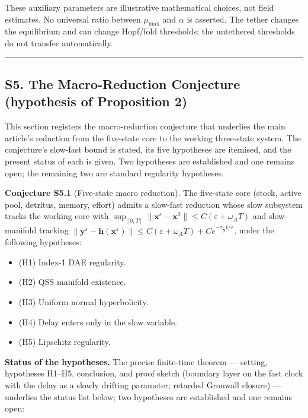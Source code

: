 \documentclass[
  10pt,
  a4paper,
]{article}
\providecommand{\tightlist}{%
  \setlength{\itemsep}{0pt}\setlength{\parskip}{0pt}}
\begin{document}
These auxiliary parameters are illustrative mathematical choices, not
field estimates. No universal ratio between \(\mu_{\max}\) and
\(\alpha\) is asserted. The tether changes the equilibrium and can
change Hopf/fold thresholds; the untethered thresholds do not transfer
automatically.

\begin{center}\rule{0.5\linewidth}{0.5pt}\end{center}

\subsection{S5. The Macro-Reduction Conjecture (hypothesis of
Proposition
2)}\label{s5.-the-macro-reduction-conjecture-hypothesis-of-proposition-2}

This section registers the macro-reduction conjecture that underlies the
main article's reduction from the five-state core to the working
three-state system. The conjecture's slow-fast bound is stated, its five
hypotheses are itemised, and the present status of each is given. Two
hypotheses are established and one remains open; the remaining two are
standard regularity hypotheses.

\textbf{Conjecture S5.1} (Five-state macro reduction). The five-state
core (stock, active pool, detritus, memory, effort) admits a slow-fast
reduction whose slow subsystem tracks the working core with
\(\sup_{[0,T]}\|\mathbf{x}^\varepsilon - \mathbf{x}^0\| \le C(\varepsilon + \omega_A T)\)
and slow-manifold tracking
\(\|\mathbf{y}^\varepsilon - \mathbf{h}(\mathbf{x}^\varepsilon)\| \le C(\varepsilon + \omega_A T) + Ce^{-\gamma_{\mathbf{y}}t/\varepsilon}\),
under the following hypotheses:

\begin{itemize}
\tightlist
\item
  (H1) Index-1 DAE regularity.
\item
  (H2) QSS manifold existence.
\item
  (H3) Uniform normal hyperbolicity.
\item
  (H4) Delay enters only in the slow variable.
\item
  (H5) Lipschitz regularity.
\end{itemize}

\textbf{Status of the hypotheses.} The precise finite-time theorem ---
setting, hypotheses H1--H5, conclusion, and proof sketch (boundary layer
on the fast clock with the delay as a slowly drifting parameter;
retarded Gronwall closure) --- underlies the status list below; two
hypotheses are established and one remains open:
\end{document}
